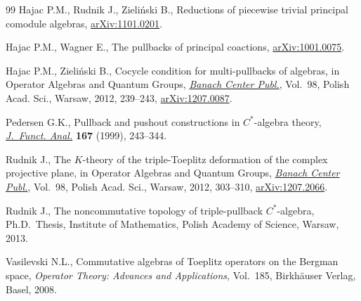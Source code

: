 \documentclass[pdftex]{sigma}
\begin{document}
\begin{thebibliography}{99}
Hajac P.M., Rudnik J., Zieli\'nski B., Reductions of piecewise trivial
  principal comodule algebras, \href{http://arxiv.org/abs/1101.0201}{arXiv:1101.0201}.

Hajac P.M., Wagner E., The pullbacks of principal coactions,
  \href{http://arxiv.org/abs/1001.0075}{arXiv:1001.0075}.

Hajac P.M., Zieli{\'n}ski B., Cocycle condition for multi-pullbacks of
  algebras, in Operator Algebras and Quantum Groups, \href{http://dx.doi.org/10.4064/bc98-0-9}{\textit{Banach Center
  Publ.}}, Vol.~98, Polish Acad. Sci., Warsaw, 2012, 239--243,
  \href{http://arxiv.org/abs/1207.0087}{arXiv:1207.0087}.

Pedersen G.K., Pullback and pushout constructions in {$C^*$}-algebra theory,
  \href{http://dx.doi.org/10.1006/jfan.1999.3456}{\textit{J.~Funct. Anal.}} \textbf{167} (1999), 243--344.

Rudnik J., The {$K$}-theory of the triple-{T}oeplitz deformation of the complex
  projective plane, in Operator Algebras and Quantum Groups, \href{http://dx.doi.org/10.4064/bc98-0-13}{\textit{Banach
  Center Publ.}}, Vol.~98, Polish Acad. Sci., Warsaw, 2012, 303--310,
  \href{http://arxiv.org/abs/1207.2066}{arXiv:1207.2066}.

Rudnik J., The noncommutative topology of triple-pullback $C^*$-algebra, Ph.D.~Thesis, Institute of Mathematics, Polish Academy of Science, Warsaw, 2013.

Vasilevski N.L., Commutative algebras of {T}oeplitz operators on the {B}ergman
  space, \textit{Operator Theory: Advances and Applications}, Vol.~185,
  Birkh\"auser Verlag, Basel, 2008.

\end{thebibliography}\LastPageEnding
\end{document}
